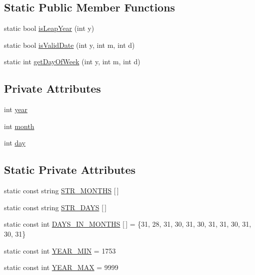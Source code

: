 \subsection*{Static Public Member Functions}
\begin{DoxyCompactItemize}
\item 
static bool \hyperlink{classDate_a208f91be271883b3225ca83a5ce4b5c6}{is\+Leap\+Year} (int y)
\item 
static bool \hyperlink{classDate_a0fda37dbf9ad83f6e1d1ecb2352f2de1}{is\+Valid\+Date} (int y, int m, int d)
\item 
static int \hyperlink{classDate_a16ea54d4178d24268ed3929b1a483bce}{get\+Day\+Of\+Week} (int y, int m, int d)
\end{DoxyCompactItemize}
\subsection*{Private Attributes}
\begin{DoxyCompactItemize}
\item 
int \hyperlink{classDate_a3eeced2ed56bc95d56782b9e738db8ea}{year}
\item 
int \hyperlink{classDate_a533843e07c6ac8d19fee9b16f5336ba2}{month}
\item 
int \hyperlink{classDate_a5b192adcabf2b2871e3f0b76c1ec1601}{day}
\end{DoxyCompactItemize}
\subsection*{Static Private Attributes}
\begin{DoxyCompactItemize}
\item 
static const string \hyperlink{classDate_a384a8a994b7f860051bc83e61a49a5f8}{S\+T\+R\+\_\+\+M\+O\+N\+T\+HS} \mbox{[}$\,$\mbox{]}
\item 
static const string \hyperlink{classDate_a9e9df675754c43945320ebbf20c90995}{S\+T\+R\+\_\+\+D\+A\+YS} \mbox{[}$\,$\mbox{]}
\item 
static const int \hyperlink{classDate_a2f9826c78c8945c8b584d1e19ea33ade}{D\+A\+Y\+S\+\_\+\+I\+N\+\_\+\+M\+O\+N\+T\+HS} \mbox{[}$\,$\mbox{]} = \{31, 28, 31, 30, 31, 30, 31, 31, 30, 31, 30, 31\}
\item 
static const int \hyperlink{classDate_a2c6e3f38e03c9de55218098acf40537f}{Y\+E\+A\+R\+\_\+\+M\+IN} = 1753
\item 
static const int \hyperlink{classDate_aded4c3bb2f76583cfc3da4f6932f3af1}{Y\+E\+A\+R\+\_\+\+M\+AX} = 9999
\end{DoxyCompactItemize}


